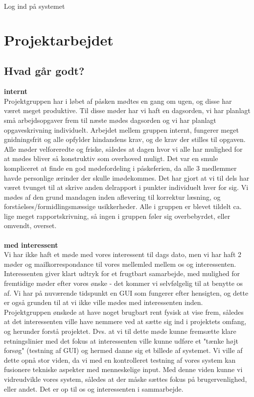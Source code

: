 \documentclass[a4paper,12pt]{article}
\begin{document}
\begin{usecase}
 {\item Log ind på systemet}
\end{usecase}


\section{Projektarbejdet}
\subsection{Hvad går godt?}

\textbf{internt}\\
Projektgruppen har i løbet af påsken mødtes en gang om ugen, og disse har været meget produktive. Til disse møder har vi haft en dagsorden, vi har planlagt små arbejdsopgaver frem til næste mødes dagsorden og vi har planlagt opgaveskrivning individuelt. Arbejdet mellem gruppen internt, fungerer meget gnidningsfrit og alle opfylder hindandens krav, og de krav der stilles til opgaven. Alle møder velforeredte og friske, således at dagen hvor vi alle har mulighed for at mødes bliver så konstruktiv som overhoved muligt.
Det var en smule kompliceret at finde en god mødefordeling i påskeferien, da alle 3 medlemmer havde personlige ærinder der skulle imødekommes. Det har gjort at vi til dels har været tvunget til at skrive anden delrapport i punkter individuelt hver for sig. Vi mødes af den grund mandagen inden aflevering til korrektur læsning, og forståelses/formidlingsmæssige usikkerheder. Alle i gruppen er blevet tildelt ca. lige meget rapportskrivning, så ingen i gruppen føler sig overbebyrdet, eller omvendt, overset. 
\\
\\
\textbf{med interessent}
\\
Vi har ikke haft et møde med vores interessent til dags dato, men vi har haft 2 møder og mailkorrespondance til vores mellemled mellem os og interessenten. Interessenten giver klart udtryk for et frugtbart samarbejde, med mulighed for fremtidige møder efter vores ønske - det kommer vi selvfølgelig til at benytte os af.
Vi har på nuværende tidspunkt en GUI som fungerer efter hensigten, og dette er også grunden til at vi ikke ville mødes med interessenten inden. Projektgruppen ønskede at have noget brugbart rent fysisk at vise frem, således at det interessenten ville have nemmere ved at sætte sig ind i projektets omfang, og herunder forstå projektet. Dvs. at vi til dette møde kunne fremsætte klare retningslinier med det fokus at interessenten ville kunne udføre et "tænke højt forsøg" (testning af GUI) og hermed danne sig et billede af systemet. Vi ville af dette opnå stor viden, da vi med en kontrolleret testning af vores system kan fusionere tekniske aspekter med menneskelige input.
Med denne viden kunne vi vidreudvikle vores system, således at der måske sættes fokus på brugervenlighed, eller andet. Det er op til os og interessenten i sammarbejde.
\\
\\
\end{document}
